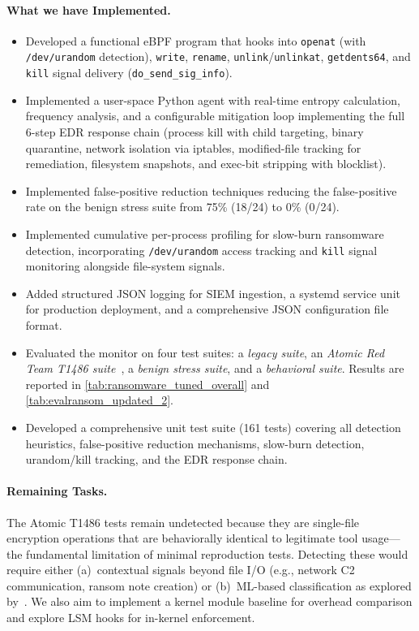 \documentclass[twocolumn, 10pt]{scrartcl}
\begin{document}
\paragraph{What we have Implemented.}
\begin{itemize}
    \item Developed a functional eBPF program that hooks into \texttt{openat} (with \texttt{/dev/urandom} detection), \texttt{write}, \texttt{rename}, \texttt{unlink}/\texttt{unlinkat}, \texttt{getdents64}, and \texttt{kill} signal delivery (\texttt{do\_send\_sig\_info}).
    \item Implemented a user-space Python agent with real-time entropy calculation, frequency analysis, and a configurable mitigation loop implementing the full 6-step EDR response chain (process kill with child targeting, binary quarantine, network isolation via iptables, modified-file tracking for remediation, filesystem snapshots, and exec-bit stripping with blocklist).
    \item Implemented false-positive reduction techniques reducing the false-positive rate on the benign stress suite from 75\% (18/24) to 0\% (0/24).
    \item Implemented cumulative per-process profiling for slow-burn ransomware detection, incorporating \texttt{/dev/urandom} access tracking and \texttt{kill} signal monitoring alongside file-system signals.
    \item Added structured JSON logging for SIEM ingestion, a systemd service unit for production deployment, and a comprehensive JSON configuration file format.
    \item Evaluated the monitor on four test suites: a \emph{legacy suite}, an \emph{Atomic Red Team T1486 suite}~\cite{atomic_red_team_T1486}, a \emph{benign stress suite}, and a \emph{behavioral suite}. Results are reported in \cref{tab:ransomware_tuned_overall} and \cref{tab:evalransom_updated_2}.
    \item Developed a comprehensive unit test suite (161 tests) covering all detection heuristics, false-positive reduction mechanisms, slow-burn detection, urandom/kill tracking, and the EDR response chain.
\end{itemize}

\paragraph{Remaining Tasks.} The Atomic T1486 tests remain undetected because they are single-file encryption operations that are behaviorally identical to legitimate tool usage---the fundamental limitation of minimal reproduction tests. Detecting these would require either (a)~contextual signals beyond file I/O (e.g., network C2 communication, ransom note creation) or (b)~ML-based classification as explored by~\cite{higuchi2023,philippart2024}. We also aim to implement a kernel module baseline for overhead comparison and explore LSM hooks for in-kernel enforcement.
\end{document}
